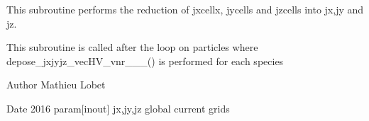 This subroutine performs the reduction of jxcellx, jycells and jzcells into jx,jy and jz. 

This subroutine is called after the loop on particles where depose\+\_\+jxjyjz\+\_\+vec\+H\+V\+\_\+vnr\+\_\+\_\+\_() is performed for each species \begin{DoxyAuthor}{Author}
Mathieu Lobet 
\end{DoxyAuthor}
\begin{DoxyDate}{Date}
2016 param\mbox{[}inout\mbox{]} jx,jy,jz global current grids 
\end{DoxyDate}
